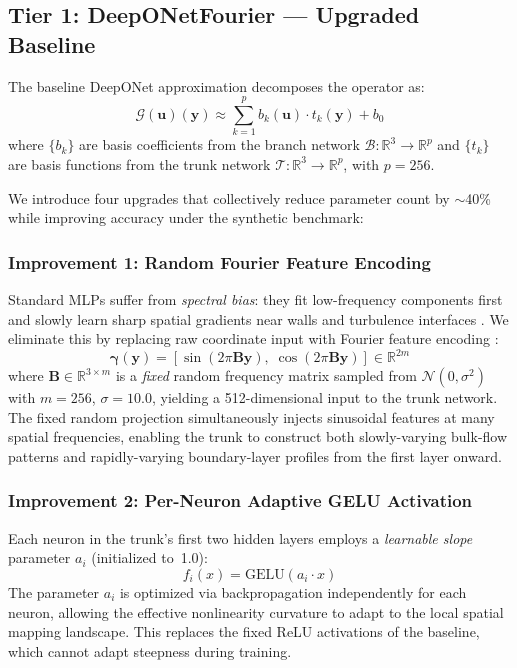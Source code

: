 \documentclass[journal]{IEEEtran}
\begin{document}
\subsection{Tier 1: DeepONetFourier --- Upgraded Baseline}
\label{sec:deeponet_fourier}

The baseline DeepONet approximation \cite{lu2021deeponet, chen1995} decomposes the operator as:
\begin{equation}
\mathcal{G}(\bm{u})(\bm{y}) \approx \sum_{k=1}^{p} b_k(\bm{u}) \cdot t_k(\bm{y}) + b_0
\label{eq:deeponet_base}
\end{equation}
where $\{b_k\}$ are basis coefficients from the branch network $\mathcal{B}: \mathbb{R}^3 \to \mathbb{R}^p$ and $\{t_k\}$ are basis functions from the trunk network $\mathcal{T}: \mathbb{R}^3 \to \mathbb{R}^p$, with $p = 256$.

We introduce four upgrades that collectively reduce parameter count by $\sim$40\% while improving accuracy under the synthetic benchmark:

\subsubsection{Improvement 1: Random Fourier Feature Encoding}
Standard MLPs suffer from \emph{spectral bias}: they fit low-frequency components first and slowly learn sharp spatial gradients near walls and turbulence interfaces \cite{rahaman2019spectral}. We eliminate this by replacing raw coordinate input with Fourier feature encoding \cite{tancik2020ffn}:
\begin{equation}
\bm{\gamma}(\bm{y}) = \left[\sin(2\pi \bm{B}\bm{y}),\;\cos(2\pi \bm{B}\bm{y})\right] \in \mathbb{R}^{2m}
\label{eq:fourier}
\end{equation}
where $\bm{B} \in \mathbb{R}^{3 \times m}$ is a \emph{fixed} random frequency matrix sampled from $\mathcal{N}(0, \sigma^2)$ with $m = 256$, $\sigma = 10.0$, yielding a 512-dimensional input to the trunk network. The fixed random projection simultaneously injects sinusoidal features at many spatial frequencies, enabling the trunk to construct both slowly-varying bulk-flow patterns and rapidly-varying boundary-layer profiles from the first layer onward.

\subsubsection{Improvement 2: Per-Neuron Adaptive GELU Activation}
Each neuron in the trunk's first two hidden layers employs a \emph{learnable slope} parameter $a_i$ (initialized to~1.0):
\begin{equation}
f_i(x) = \text{GELU}(a_i \cdot x)
\label{eq:adaptive_gelu}
\end{equation}
The parameter $a_i$ is optimized via backpropagation independently for each neuron, allowing the effective nonlinearity curvature to adapt to the local spatial mapping landscape. This replaces the fixed ReLU activations of the baseline, which cannot adapt steepness during training.
\end{document}

